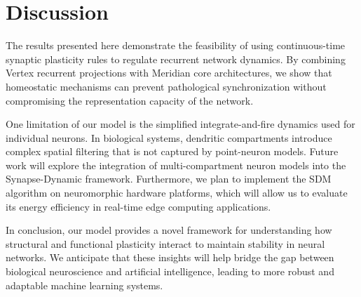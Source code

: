 \section{Discussion}
The results presented here demonstrate the feasibility of using continuous-time synaptic plasticity rules to regulate recurrent network dynamics.
By combining Vertex recurrent projections with Meridian core architectures, we show that homeostatic mechanisms can prevent pathological synchronization without compromising the representation capacity of the network.

One limitation of our model is the simplified integrate-and-fire dynamics used for individual neurons.
In biological systems, dendritic compartments introduce complex spatial filtering that is not captured by point-neuron models.
Future work will explore the integration of multi-compartment neuron models into the Synapse-Dynamic framework.
Furthermore, we plan to implement the SDM algorithm on neuromorphic hardware platforms, which will allow us to evaluate its energy efficiency in real-time edge computing applications.

In conclusion, our model provides a novel framework for understanding how structural and functional plasticity interact to maintain stability in neural networks.
We anticipate that these insights will help bridge the gap between biological neuroscience and artificial intelligence, leading to more robust and adaptable machine learning systems.
